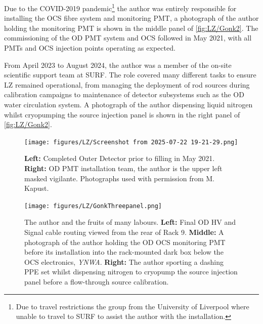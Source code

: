 Due to the COVID-2019 pandemic\footnote{Due to travel restrictions the group from the University of Liverpool where unable to travel to SURF to assist the author with the installation.} the author was entirely responsible for installing the OCS fibre system and monitoring PMT, a photograph of the author holding the monitoring PMT is shown in the middle panel of \autoref{fig:LZ/Gonk2}. The commissioning of the OD PMT system and OCS followed in May 2021, with all PMTs and OCS injection points operating as expected.

From April 2023 to August 2024, the author was a member of the on-site scientific support team at SURF. The role covered many different tasks to ensure LZ remained operational, from managing the deployment of rod sources during calibration campaigns to maintenance of detector subsystems such as the OD water circulation system. A photograph of the author dispensing liquid nitrogen whilst cryopumping the source injection panel is shown in the right panel of \autoref{fig:LZ/Gonk2}.

\newpage

\begin{figure}[ht!]
    \centering
    \texttt{[image: figures/LZ/Screenshot from 2025-07-22 19-21-29.png]}
    \caption[Completed Outer Detector prior to filling in May 2021 alongside OD PMT installation team.]{\textbf{Left:} Completed Outer Detector prior to filling in May 2021. \textbf{Right:} OD PMT installation team, the author is the upper left masked vigilante. Photographs used with permission from M. Kapust.}
    \label{fig:LZ/ODImg}
\end{figure}

\begin{figure}[ht!]
    \centering
    \texttt{[image: figures/LZ/GonkThreepanel.png]}
    \caption[The author and the fruits of many labours.]{The author and the fruits of many labours. \textbf{Left:} Final OD HV and Signal cable routing viewed from the rear of Rack 9. \textbf{Middle:} A photograph of the author holding the OD OCS monitoring PMT before its installation into the rack-mounted dark box below the OCS electronics, \textit{YNWA}. \textbf{Right:} The author sporting a dashing PPE set whilst dispensing nitrogen to cryopump the source injection panel before a flow-through source calibration.}
    \label{fig:LZ/Gonk2}
\end{figure}
